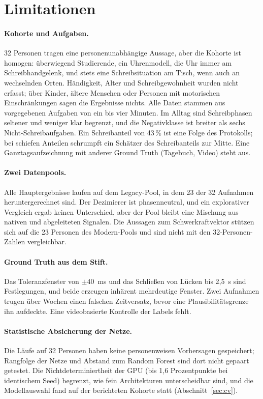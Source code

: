 \section{Limitationen}
\label{sec:limitations}

\paragraph{Kohorte und Aufgaben.} 32 Personen tragen eine
personenunabhängige Aussage, aber die Kohorte ist homogen: überwiegend
Studierende, ein Uhrenmodell, die Uhr immer am Schreibhandgelenk, und
stets eine Schreibsituation am Tisch, wenn auch an wechselnden Orten.
Händigkeit, Alter und Schreibgewohnheit wurden nicht erfasst; über Kinder,
ältere Menschen oder Personen mit motorischen Einschränkungen sagen die
Ergebnisse nichts. Alle Daten stammen aus vorgegebenen Aufgaben von ein bis
vier Minuten. Im Alltag sind Schreibphasen seltener und weniger klar
begrenzt, und die Negativklasse ist breiter als sechs Nicht-Schreibaufgaben.
Ein Schreibanteil von 43\,\% ist eine Folge des Protokolls; bei schiefen
Anteilen schrumpft ein Schätzer des Schreibanteils zur Mitte. Eine
Ganztagsaufzeichnung mit anderer Ground Truth (Tagebuch, Video) steht aus.

\paragraph{Zwei Datenpools.} Alle Hauptergebnisse laufen auf dem Legacy-Pool,
in dem 23 der 32 Aufnahmen heruntergerechnet sind. Der Dezimierer ist
phasenneutral, und ein explorativer Vergleich ergab keinen Unterschied, aber
der Pool bleibt eine Mischung aus nativen und abgeleiteten Signalen. Die
Aussagen zum Schwerkraftvektor stützen sich auf die 23 Personen des
Modern-Pools und sind nicht mit den 32-Personen-Zahlen vergleichbar.

\paragraph{Ground Truth aus dem Stift.} Das Toleranzfenster von $\pm 40$~ms
und das Schließen von Lücken bis 2,5~s sind Festlegungen, und beide
erzeugen inhärent mehrdeutige Fenster. Zwei Aufnahmen trugen über Wochen
einen falschen Zeitversatz, bevor eine Plausibilitätsgrenze ihn aufdeckte.
Eine videobasierte Kontrolle der Labels fehlt.

\paragraph{Statistische Absicherung der Netze.} Die Läufe auf 32 Personen
haben keine personenweisen Vorhersagen gespeichert; Rangfolge der Netze und
Abstand zum Random Forest sind dort nicht gepaart getestet. Die
Nichtdeterminiertheit der GPU (bis 1,6 Prozentpunkte bei identischem Seed)
begrenzt, wie fein Architekturen unterscheidbar sind, und die Modellauswahl
fand auf der berichteten Kohorte statt (Abschnitt~\ref{sec:cv}).


